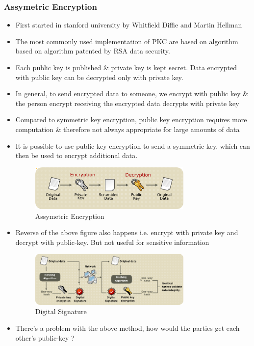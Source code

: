 \documentclass[a4paper]{article}
\begin{document}
\subsubsection{Assymetric Encryption}
\begin{itemize}
    \item First started in stanford university by Whitfield Diffie and Martin Hellman
    \item The most commonly used implementation of PKC are based on algorithm based on algorithm patented by RSA data security.
    \item Each public key is published \& private key is kept secret. Data encrypted with public key can be decrypted only with private key.
    \item In general, to send encrypted data to someone, we encrypt with public key \& the person encrypt receiving the 
        encrypted data decrypts with private key
    \item Compared to symmetric key encryption, public key encryption requires more computation \& therefore not always appropriate for large amounts of data
    \item It is possible to use public-key encryption to send a symmetric key, which can then be used to encrypt additional data.
        \begin{figure}[h]
            \centering
            \includegraphics[width=80mm]{assymetric.png}
            \caption{Assymetric Encryption}
        \end{figure}
    \item Reverse of the above figure also happens i.e. encrypt with private key and decrypt with public-key. But not useful for sensitive information
        \begin{figure}[h]
        \centering
        \includegraphics[width=80mm]{digitalsignature.png}
        \caption{Digital Signature}
        \end{figure}
    \item There's a problem with the above method, how would the parties get each other's public-key ? 

\end{itemize}
\end{document}
